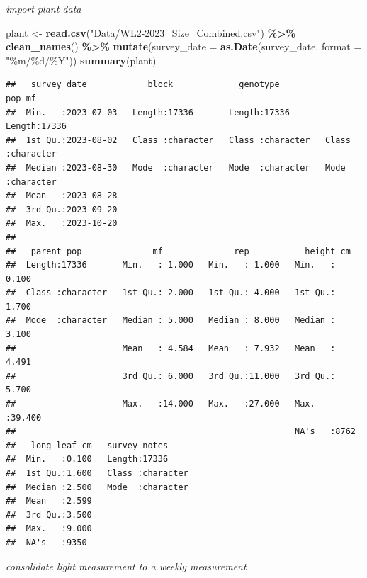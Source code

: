 \documentclass[
]{article}
\newenvironment{Shaded}{\begin{snugshade}}{\end{snugshade}}
\newcommand{\AttributeTok}[1]{\textcolor[rgb]{0.13,0.29,0.53}{#1}}
\newcommand{\FunctionTok}[1]{\textcolor[rgb]{0.13,0.29,0.53}{\textbf{#1}}}
\newcommand{\NormalTok}[1]{#1}
\newcommand{\OtherTok}[1]{\textcolor[rgb]{0.56,0.35,0.01}{#1}}
\newcommand{\SpecialCharTok}[1]{\textcolor[rgb]{0.81,0.36,0.00}{\textbf{#1}}}
\newcommand{\StringTok}[1]{\textcolor[rgb]{0.31,0.60,0.02}{#1}}
\begin{document}
\emph{import plant data}

\begin{Shaded}
\begin{Highlighting}[]
\NormalTok{plant }\OtherTok{\textless{}{-}} \FunctionTok{read.csv}\NormalTok{(}\StringTok{"Data/WL2{-}2023\_Size\_Combined.csv"}\NormalTok{) }\SpecialCharTok{\%\textgreater{}\%}
  \FunctionTok{clean\_names}\NormalTok{() }\SpecialCharTok{\%\textgreater{}\%}
  \FunctionTok{mutate}\NormalTok{(}\AttributeTok{survey\_date =} \FunctionTok{as.Date}\NormalTok{(survey\_date, }\AttributeTok{format =} \StringTok{"\%m/\%d/\%Y"}\NormalTok{))}
\FunctionTok{summary}\NormalTok{(plant)}
\end{Highlighting}
\end{Shaded}

\begin{verbatim}
##   survey_date            block             genotype            pop_mf         
##  Min.   :2023-07-03   Length:17336       Length:17336       Length:17336      
##  1st Qu.:2023-08-02   Class :character   Class :character   Class :character  
##  Median :2023-08-30   Mode  :character   Mode  :character   Mode  :character  
##  Mean   :2023-08-28                                                           
##  3rd Qu.:2023-09-20                                                           
##  Max.   :2023-10-20                                                           
##                                                                               
##   parent_pop              mf              rep           height_cm     
##  Length:17336       Min.   : 1.000   Min.   : 1.000   Min.   : 0.100  
##  Class :character   1st Qu.: 2.000   1st Qu.: 4.000   1st Qu.: 1.700  
##  Mode  :character   Median : 5.000   Median : 8.000   Median : 3.100  
##                     Mean   : 4.584   Mean   : 7.932   Mean   : 4.491  
##                     3rd Qu.: 6.000   3rd Qu.:11.000   3rd Qu.: 5.700  
##                     Max.   :14.000   Max.   :27.000   Max.   :39.400  
##                                                       NA's   :8762    
##   long_leaf_cm   survey_notes      
##  Min.   :0.100   Length:17336      
##  1st Qu.:1.600   Class :character  
##  Median :2.500   Mode  :character  
##  Mean   :2.599                     
##  3rd Qu.:3.500                     
##  Max.   :9.000                     
##  NA's   :9350
\end{verbatim}

\emph{consolidate light measurement to a weekly measurement}
\end{document}
